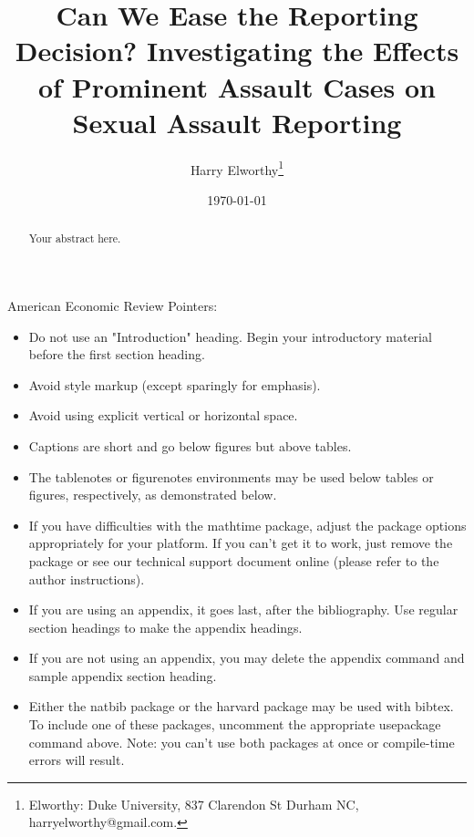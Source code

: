 \documentclass[AER]{AEA}
\begin{document}
\title{Can We Ease the Reporting Decision? Investigating the Effects of Prominent Assault Cases on Sexual Assault Reporting}
\author{Harry Elworthy\thanks{Elworthy: Duke University, 837 Clarendon St Durham NC, harryelworthy@gmail.com.}}
\date{\today}
\pubMonth{}
\pubYear{}
\pubVolume{}
\pubIssue{}
\JEL{}
\Keywords{}

\begin{abstract}
Your abstract here.
\end{abstract}


\maketitle

American Economic Review Pointers:

\begin{itemize}
\item Do not use an "Introduction" heading. Begin your introductory material
before the first section heading.

\item Avoid style markup (except sparingly for emphasis).

\item Avoid using explicit vertical or horizontal space.

\item Captions are short and go below figures but above tables.

\item The tablenotes or figurenotes environments may be used below tables
or figures, respectively, as demonstrated below.

\item If you have difficulties with the mathtime package, adjust the package
options appropriately for your platform. If you can't get it to work, just
remove the package or see our technical support document online (please
refer to the author instructions).

\item If you are using an appendix, it goes last, after the bibliography.
Use regular section headings to make the appendix headings.

\item If you are not using an appendix, you may delete the appendix command
and sample appendix section heading.

\item Either the natbib package or the harvard package may be used with bibtex.
To include one of these packages, uncomment the appropriate usepackage command
above. Note: you can't use both packages at once or compile-time errors will result.

\end{itemize}
\end{document}
